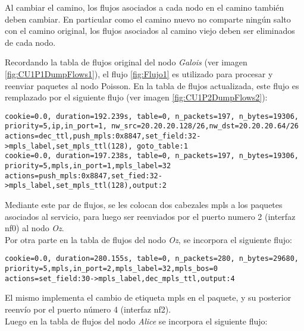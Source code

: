 Al cambiar el camino, los flujos asociados a cada nodo en el camino tambi\'en deben cambiar. En particular como el camino nuevo no comparte ning\'un salto con el camino original, los flujos asociados al camino viejo deben ser eliminados de cada nodo.

Recordando la tabla de flujos original del nodo \textit{Galois} (ver imagen \ref{fig:CU1P1DumpFlows1}), el flujo \ref{fig:Flujo1} es utilizado para procesar y reenviar paquetes al nodo Poisson. En la tabla de flujos actualizada, este flujo es remplazado por el siguiente flujo (ver imagen \ref{fig:CU1P2DumpFlows2}):

\begin{center}
\texttt{cookie=0.0, duration=192.239s, table=0, n\_packets=197, n\_bytes=19306, \\
priority=5,ip,in\_port=1, nw\_src=20.20.20.128/26,nw\_dst=20.20.20.64/26 \\
actions=dec\_ttl,push\_mpls:0x8847,set\_field:32->mpls\_label,set\_mpls\_ttl(128), goto\_table:1 \\
\vspace{0.5cm}
cookie=0.0, duration=197.238s, table=0, n\_packets=197, n\_bytes=19306, \\
priority=5,mpls,in\_port=1,mpls\_label=32 \\
actions=push\_mpls:0x8847,set\_fied:32->mpls\_label,set\_mpls\_ttl(128),output:2}
\end{center}

Mediante este par de flujos, se les colocan dos cabezales mpls a los paquetes asociados al servicio, para luego ser reenviados por el puerto numero 2 (interfaz nf0) al nodo \textit{Oz}.\\

Por otra parte en la tabla de flujos del nodo \textit{Oz}, se incorpora el siguiente flujo:

\begin{center}
\texttt{cookie=0.0, duration=280.155s, table=0, n\_packets=280, n\_bytes=29680, \\
priority=5,mpls,in\_port=2,mpls\_label=32,mpls\_bos=0 \\
actions=set\_field:30->mpls\_label,dec\_mpls\_ttl,output:4 }
\end{center}

El mismo implementa el cambio de etiqueta mpls en el paquete, y su posterior reenvío por el puerto n\'umero 4 (interfaz nf2).\\

Luego en la tabla de flujos del nodo \textit{Alice} se incorpora el siguiente flujo:

